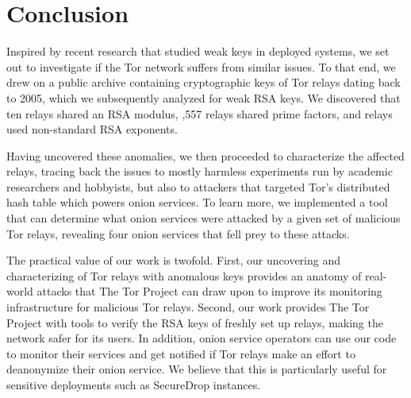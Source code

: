\section{Conclusion}
\label{sec:conclusion}

Inspired by recent research that studied weak keys in deployed systems, we set
out to investigate if the Tor network suffers from similar issues.  To that
end, we drew on a public archive containing cryptographic keys of Tor relays
dating back to 2005, which we subsequently analyzed for weak RSA keys.  We
discovered that \first ten relays shared an RSA modulus, ,557 relays
shared prime factors, and  relays used non-standard RSA exponents.

Having uncovered these anomalies, we then proceeded to characterize the
affected relays, tracing back the issues to mostly harmless experiments run by
academic researchers and hobbyists, but also to attackers that targeted Tor's
distributed hash table which powers onion services.  To learn more, we
implemented a tool that can determine what onion services were attacked by a
given set of malicious Tor relays, revealing four onion services that fell prey
to these attacks.

The practical value of our work is twofold.  First, our uncovering and
characterizing of Tor relays with anomalous keys provides an anatomy of
real-world attacks that The Tor Project can draw upon to improve its monitoring
infrastructure for malicious Tor relays.  Second, our work provides The Tor
Project with tools to verify the RSA keys of freshly set up relays, making the
network safer for its users.  In addition, onion service operators can use our
code to monitor their services and get notified if Tor relays make an effort to
deanonymize their onion service.  We believe that this is particularly useful
for sensitive deployments such as SecureDrop instances.
